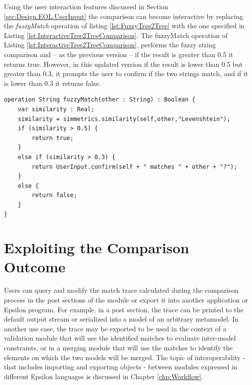 Using the user interaction features discussed in Section \ref{sec:Design.EOL.UserInput} the comparison can become interactive by replacing the \emph{fuzzyMatch} operation of listing \ref{lst:FuzzyTree2Tree} with the one specified in Listing \ref{lst:InteractiveTree2TreeComparison}. The fuzzyMatch operation of Listing \ref{lst:InteractiveTree2TreeComparison}, performs the fuzzy string comparison and -- as the previous version -- if the result is greater than 0.5 it returns true. However, in this updated version if the result is lower than 0.5 but greater than 0.3, it prompts the user to confirm if the two strings match, and if it is lower than 0.3 it returns false.

\begin{lstlisting}[float=tbp, caption=An interactive version of the fuzzyMatch operation of Listing \ref{lst:FuzzyTree2Tree}, label=lst:InteractiveTree2TreeComparison, language=ECL]
operation String fuzzyMatch(other : String) : Boolean {
	var similarity : Real;
	similarity = simmetrics.similarity(self,other,"Levenshtein");
	if (similarity > 0.5) {
		return true;
	}
	else if (similarity > 0.3) {
		return UserInput.confirm(self + " matches " + other + "?");
	}
	else {
		return false;
	}
}\end{lstlisting}

\section{Exploiting the Comparison Outcome}

Users can query and modify the match trace calculated during the comparison process in the post sections of the module or export it into another application or Epsilon program. For example, in a post section, the trace can be printed to the default output stream or serialized into a model of an arbitrary metamodel. In another use case, the trace may be exported to be used in the context of a validation module that will use the identified matches to evaluate inter-model constraints, or in a merging module that will use the matches to identify the elements on which the two models will be merged. The topic of interoperability - that includes importing and exporting objects - between modules expressed in different Epsilon languages is discussed in Chapter \ref{chp:Workflow}.